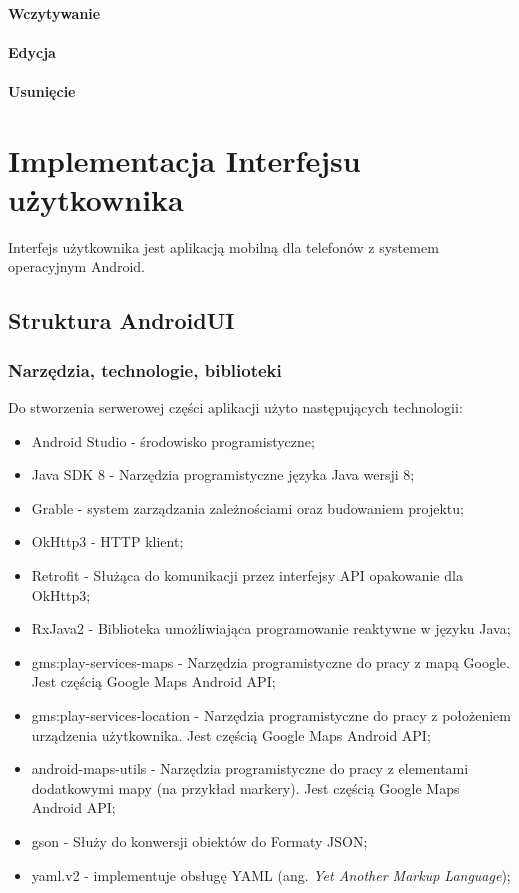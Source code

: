\paragraph{Wczytywanie}
\paragraph{Edycja}
\paragraph{Usunięcie}
%
\section{Implementacja Interfejsu użytkownika}
Interfejs użytkownika jest aplikacją mobilną dla telefonów z systemem operacyjnym Android.
\subsection{Struktura AndroidUI}
\subsubsection{Narzędzia, technologie, biblioteki}
Do stworzenia serwerowej części aplikacji użyto następujących technologii:
\begin{itemize}
    \item Android Studio - środowisko programistyczne;
    \item Java SDK 8 - Narzędzia programistyczne języka Java wersji 8;
    \item Grable - system zarządzania zależnościami oraz budowaniem projektu;
    \item OkHttp3 - HTTP klient;
    \item Retrofit - Służąca do komunikacji przez interfejsy API opakowanie dla OkHttp3;
    \item RxJava2 - Biblioteka umożliwiająca programowanie reaktywne w języku Java;
    \item gms:play-services-maps - Narzędzia programistyczne do pracy z mapą Google. Jest częścią Google Maps Android API;
    \item gms:play-services-location - Narzędzia programistyczne do pracy z położeniem urządzenia użytkownika. Jest częścią Google Maps Android API;
    \item android-maps-utils - Narzędzia programistyczne do pracy z elementami dodatkowymi mapy (na przykład markery). Jest częścią Google Maps Android API;
    \item gson - Służy do konwersji obiektów do Formaty JSON;
    \item yaml.v2 - implementuje obsługę YAML (ang. \textit{Yet Another Markup Language});
\end{itemize}

